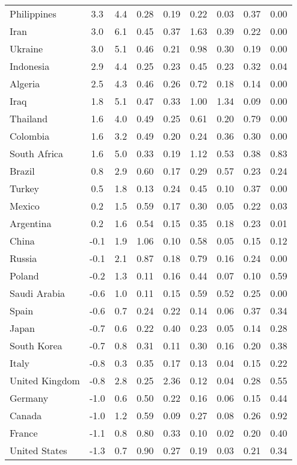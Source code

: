\begin{tabular}[t]{lcccccccc}
Philippines & 3.3 & 4.4 & 0.28 & 0.19 & 0.22 & 0.03 & 0.37 & 0.00\\
Iran & 3.0 & 6.1 & 0.45 & 0.37 & 1.63 & 0.39 & 0.22 & 0.00\\
Ukraine & 3.0 & 5.1 & 0.46 & 0.21 & 0.98 & 0.30 & 0.19 & 0.00\\
Indonesia & 2.9 & 4.4 & 0.25 & 0.23 & 0.45 & 0.23 & 0.32 & 0.04\\
Algeria & 2.5 & 4.3 & 0.46 & 0.26 & 0.72 & 0.18 & 0.14 & 0.00\\
Iraq & 1.8 & 5.1 & 0.47 & 0.33 & 1.00 & 1.34 & 0.09 & 0.00\\
Thailand & 1.6 & 4.0 & 0.49 & 0.25 & 0.61 & 0.20 & 0.79 & 0.00\\
Colombia & 1.6 & 3.2 & 0.49 & 0.20 & 0.24 & 0.36 & 0.30 & 0.00\\
South Africa & 1.6 & 5.0 & 0.33 & 0.19 & 1.12 & 0.53 & 0.38 & 0.83\\
Brazil & 0.8 & 2.9 & 0.60 & 0.17 & 0.29 & 0.57 & 0.23 & 0.24\\
Turkey & 0.5 & 1.8 & 0.13 & 0.24 & 0.45 & 0.10 & 0.37 & 0.00\\
Mexico & 0.2 & 1.5 & 0.59 & 0.17 & 0.30 & 0.05 & 0.22 & 0.03\\
Argentina & 0.2 & 1.6 & 0.54 & 0.15 & 0.35 & 0.18 & 0.23 & 0.01\\
China & -0.1 & 1.9 & 1.06 & 0.10 & 0.58 & 0.05 & 0.15 & 0.12\\
Russia & -0.1 & 2.1 & 0.87 & 0.18 & 0.79 & 0.16 & 0.24 & 0.00\\
Poland & -0.2 & 1.3 & 0.11 & 0.16 & 0.44 & 0.07 & 0.10 & 0.59\\
Saudi Arabia & -0.6 & 1.0 & 0.11 & 0.15 & 0.59 & 0.52 & 0.25 & 0.00\\
Spain & -0.6 & 0.7 & 0.24 & 0.22 & 0.14 & 0.06 & 0.37 & 0.34\\
Japan & -0.7 & 0.6 & 0.22 & 0.40 & 0.23 & 0.05 & 0.14 & 0.28\\
South Korea & -0.7 & 0.8 & 0.31 & 0.11 & 0.30 & 0.16 & 0.20 & 0.38\\
Italy & -0.8 & 0.3 & 0.35 & 0.17 & 0.13 & 0.04 & 0.15 & 0.22\\
United Kingdom & -0.8 & 2.8 & 0.25 & 2.36 & 0.12 & 0.04 & 0.28 & 0.55\\
Germany & -1.0 & 0.6 & 0.50 & 0.22 & 0.16 & 0.06 & 0.15 & 0.44\\
Canada & -1.0 & 1.2 & 0.59 & 0.09 & 0.27 & 0.08 & 0.26 & 0.92\\
France & -1.1 & 0.8 & 0.80 & 0.33 & 0.10 & 0.02 & 0.20 & 0.40\\
United States & -1.3 & 0.7 & 0.90 & 0.27 & 0.19 & 0.03 & 0.21 & 0.34\\
\bottomrule
\end{tabular}